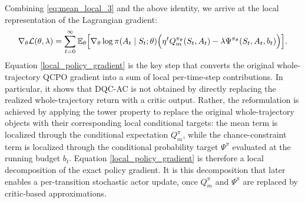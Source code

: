Combining \eqref{eq:mean_local_3} and the above identity, we arrive at the local representation of the Lagrangian gradient:
\begin{align}\label{local_policy_gradient}
    \nabla_{\theta}\mathcal{L}(\theta,\lambda)
    =
    \sum_{t=0}^{\infty}
    \mathbb{E}_{\theta}\Bigl[
        \nabla_{\theta}\log\pi(A_t\mid S_t;\theta)
        \Bigl(
            \eta^t Q_m^{\pi_{\theta}}(S_t,A_t)
            -
            \lambda \Psi^{\pi_{\theta}}(S_t,A_t,b_t)
        \Bigr)
    \Bigr].
\end{align}
Equation \eqref{local_policy_gradient} is the key step that converts the original whole-trajectory QCPO gradient into a sum of local per-time-step contributions. In particular, it shows that DQC-AC is not obtained by directly replacing the realized whole-trajectory return with a critic output. Rather, the reformulation is achieved by applying the tower property to replace the original whole-trajectory objects with their corresponding local conditional targets: the mean term is localized through the conditional expectation $Q_m^\pi$, while the chance-constraint term is localized through the conditional probability target $\Psi^\pi$ evaluated at the running budget $b_t$. Equation \eqref{local_policy_gradient} is therefore a local decomposition of the exact policy gradient. It is this decomposition that later enables a per-transition stochastic actor update, once $Q_m^\pi$ and $\Psi^\pi$ are replaced by critic-based approximations.

